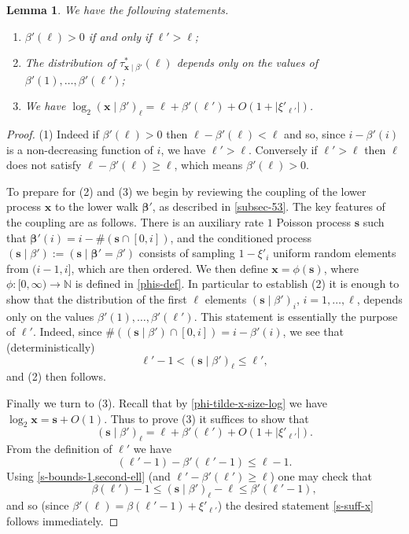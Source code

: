 \documentclass[11pt,reqno]{amsart}
\numberwithin{equation}{section}
\newtheorem{lemma}[theorem]{Lemma}
\theoremstyle{definition}
\theoremstyle{remark}
\newcommand{\mbf}{\mathbf}
\def\boldbeta{\boldsymbol\beta}
\renewcommand{\le}{\leqslant}
\renewcommand{\ge}{\geqslant}
\newcommand\N{\mathbb{N}}
\begin{document}
\begin{lemma} \label{lem172} We have the following statements.
\begin{enumerate}
\item $\beta'(\ell) > 0$ if and only if $\ell' > \ell$;
\item The distribution of $\tau^*_{\mbf{x} \mid \beta'}(\ell)$ depends only on the values of $\beta'(1),\dots, \beta'(\ell')$;
\item We have $\log_2 (\mbf{x} \mid \beta')_{\ell}   = \ell +  \beta'(\ell') + O(1 +  |\xi'_{\ell'}|)$.
\end{enumerate}
\end{lemma}
\begin{proof}
(1) Indeed if $\beta'(\ell) > 0$ then $\ell - \beta'(\ell) < \ell$ and so, since $i - \beta'(i)$ is a non-decreasing function of $i$, we have $\ell' > \ell$. Conversely if $\ell' > \ell$ then $\ell$ does not satisfy $\ell - \beta'(\ell) \ge \ell$, which means $\beta'(\ell) > 0$.

To prepare for (2) and (3) we begin by reviewing the coupling of the lower process $\mbf{x}$ to the lower walk $\boldbeta'$, as described in \cref{subsec-53}. The key features of the coupling are as follows. There is an auxiliary rate $1$ Poisson process $\mbf{s}$ such that $\boldbeta'(i) = i - \#(\mbf{s} \cap [0,i])$, and the conditioned process $(\mbf{s} \mid \beta') := (\mbf{s} \mid \boldbeta' = \beta')$ consists of sampling $1 - \xi'_i$ uniform random elements from $(i-1,i]$, which are then ordered. We then define $\mbf{x} = \phi(\mbf{s})$, where $\phi : [0,\infty) \rightarrow \N$ is defined in \cref{phis-def}. In particular to establish (2) it is enough to show that the distribution of the first $\ell$ elements $(\mbf{s} \mid \beta')_i$, $i = 1,\dots, \ell$, depends only on the values $\beta'(1),\dots, \beta'(\ell')$. This statement is essentially the purpose of $\ell'$. Indeed, since $\# ((\mbf{s} \mid \beta') \cap [0,i]) = i - \beta'(i)$, we see that (deterministically)
\begin{equation}\label{s-bounds-1} \ell'-1 < (\mbf{s} \mid \beta')_{\ell} \le \ell',\end{equation} and (2) then follows.

Finally we turn to (3). Recall that by \cref{phi-tilde-x-size-log} we have $\log_2 \mbf{x} = \mbf{s} + O(1)$. Thus to prove (3) it suffices to show that 
\begin{equation}\label{s-suff-x} (\mbf{s} \mid \beta')_{\ell}   =  \ell + \beta'(\ell') + O(1 + |\xi'_{\ell'}|).\end{equation}
From the definition of $\ell'$ we have \begin{equation}\label{second-ell} (\ell' - 1) - \beta'(\ell' - 1) \le \ell - 1.\end{equation} Using \cref{s-bounds-1,second-ell} (and $\ell' - \beta'(\ell') \ge \ell$) one may check that 
\begin{equation*} \beta(\ell') - 1\le (\mbf{s} \mid \beta')_{\ell} - \ell \le \beta'(\ell' - 1),\end{equation*} and so (since $\beta'(\ell) = \beta(\ell'-1) + \xi'_{\ell'}$) the desired statement \cref{s-suff-x} follows immediately.
\end{proof}
\end{document}
